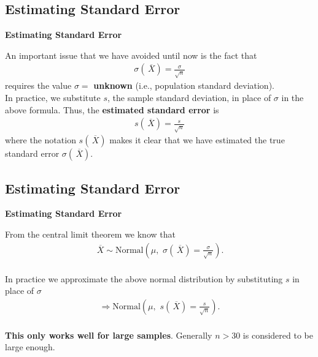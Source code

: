 \documentclass[compress]{beamer}        %
\makeatletter
\newcommand{\tcb}{\textcolor{beamer@blendedblue}}
\makeatother
\begin{document}
\subsection{Estimating Standard Error}
\begin{frame}{\bf \tcb{Estimating Standard Error}}

An important issue that we have avoided until now is the fact that
\begin{align*}
\sigma(\,\overline{\!X}) = \frac{\sigma}{\sqrt{n}}
\end{align*}
requires the value $\sigma =$ {\bf unknown} (i.e., population standard deviation).\\[0.6cm]

In practice, we substitute $s$, the sample standard deviation, in place of $\sigma$ in the above formula. Thus, the {\bf estimated standard error} is
\begin{align*}
\boxed{s(\,\overline{\!X}) = \frac{s}{\sqrt{n}}}
\end{align*}
where the notation $s(\,\overline{\!X})$ makes it clear that we have estimated the true standard error $\sigma(\,\overline{\!X})$.

\end{frame}


\subsection{Estimating Standard Error}
\begin{frame}{\bf \tcb{Estimating Standard Error}}

From the central limit theorem we know that
\begin{align*}
\,\overline{\!X} \sim \text{Normal}\left(\mu,\,\, \sigma(\,\overline{\!X}) = \frac{\sigma}{\sqrt{n}}\right).\\
\end{align*}

In practice we approximate the above normal distribution by substituting $s$ in place of $\sigma$
\begin{align*}
\Rightarrow \text{Normal}\left(\mu,\,\, s(\,\overline{\!X}) = \frac{s}{\sqrt{n}}\right).\\
\end{align*}

{\bf This only works well for large samples}. Generally {\boldmath$\boxed{n > 30}$} is considered to be large enough.

\end{frame}
\end{document}
